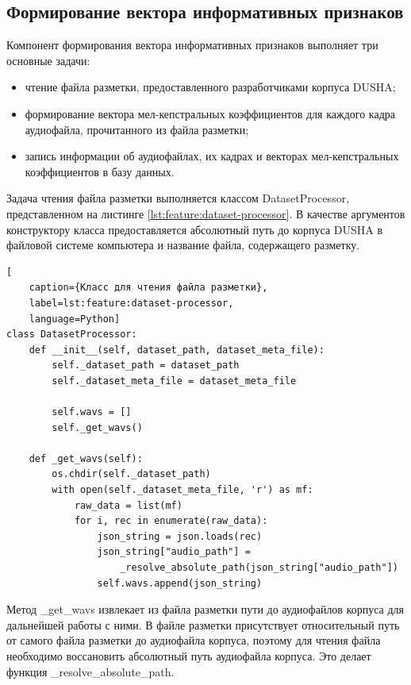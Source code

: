 \subsection{Формирование вектора информативных признаков}
Компонент формирования вектора информативных признаков выполняет три основные задачи:
\begin{itemize}
	\item чтение файла разметки, предоставленного разработчиками корпуса DUSHA;
	\item формирование вектора мел-кепстральных коэффициентов для каждого кадра аудиофайла, прочитанного из файла разметки;
	\item запись информации об аудиофайлах, их кадрах и векторах мел-кепстральных коэффициентов в базу данных.
\end{itemize}
Задача чтения файла разметки выполняется классом DatasetProcessor, представленном на листинге \ref{lst:feature:dataset-processor}. В качестве аргументов конструктору класса предоставляется абсолютный путь до корпуса DUSHA в файловой системе компьютера и название файла, содержащего разметку.
\begin{lstlisting}[
	caption={Класс для чтения файла разметки},
	label=lst:feature:dataset-processor,
	language=Python]
class DatasetProcessor:
	def __init__(self, dataset_path, dataset_meta_file):
		self._dataset_path = dataset_path
		self._dataset_meta_file = dataset_meta_file
	
		self.wavs = []
		self._get_wavs()
	
	def _get_wavs(self):
		os.chdir(self._dataset_path)
		with open(self._dataset_meta_file, 'r') as mf:
			raw_data = list(mf)
			for i, rec in enumerate(raw_data):
				json_string = json.loads(rec)
				json_string["audio_path"] =
					_resolve_absolute_path(json_string["audio_path"])
				self.wavs.append(json_string)
\end{lstlisting}
Метод \_get\_wavs извлекает из файла разметки пути до аудиофайлов корпуса для дальнейшей работы с ними. В файле разметки присутствует относительный путь от самого файла разметки до аудиофайла корпуса, поэтому для чтения файла необходимо воссановить абсолютный путь аудиофайла корпуса. Это делает функция \_resolve\_absolute\_path.

